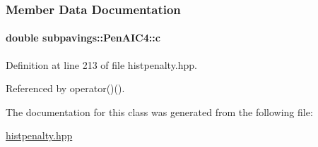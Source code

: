 \subsubsection{\-Member \-Data \-Documentation}
\hypertarget{classsubpavings_1_1PenAIC4_a4bc616a39893c9f5bc3c2b3123aa6d1f}{
\paragraph[{c}]{\setlength{\rightskip}{0pt plus 5cm}double {\bf subpavings\-::\-Pen\-A\-I\-C4\-::c}}}\label{classsubpavings_1_1PenAIC4_a4bc616a39893c9f5bc3c2b3123aa6d1f}


\-Definition at line 213 of file histpenalty.\-hpp.



\-Referenced by operator()().



\-The documentation for this class was generated from the following file\-:\begin{DoxyCompactItemize}
\item 
\hyperlink{histpenalty_8hpp}{histpenalty.\-hpp}\end{DoxyCompactItemize}
